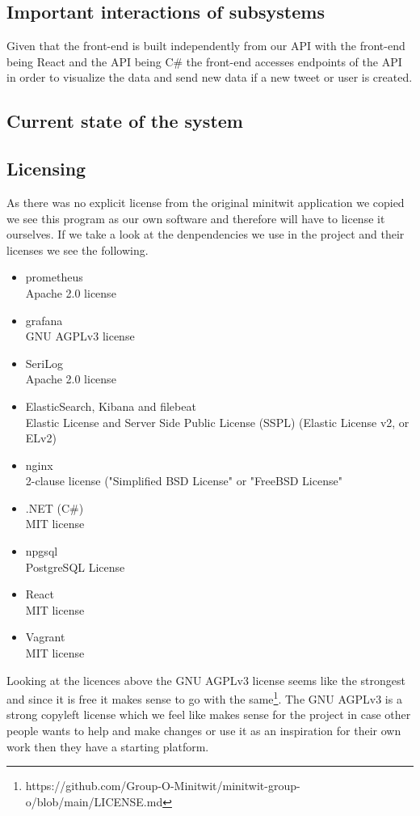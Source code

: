 \documentclass{article}
\begin{document}

\subsection{Important interactions of subsystems}
Given that the front-end is built independently from our API with the front-end being React and the API being C\# the front-end accesses endpoints of the API in order to visualize the data and send new data if a new tweet or  user is created. 
\subsection{Current state of the system}
\subsection{Licensing}
As there was no explicit license from the original minitwit application we copied we see this program as our own software and therefore will have to license it ourselves. If we take a look at the denpendencies we use in the project and their licenses we see the following.
\begin{itemize}
    \item prometheus\\
    Apache 2.0 license
    \item grafana\\
    GNU AGPLv3 license
    \item SeriLog\\
    Apache 2.0 license
    \item ElasticSearch, Kibana and filebeat\\
    Elastic License and Server Side Public License (SSPL) (Elastic License v2, or ELv2) 
    \item nginx\\
    2-clause license ("Simplified BSD License" or "FreeBSD License"
    \item .NET (C\#)\\
    MIT license
    \item npgsql\\
    PostgreSQL License
    \item React\\
    MIT license
    \item Vagrant\\ 
    MIT license
\end{itemize} 
Looking at the licences above the GNU AGPLv3 license seems like the strongest and since it is free it makes sense to go with the same\footnote{https://github.com/Group-O-Minitwit/minitwit-group-o/blob/main/LICENSE.md}. The GNU AGPLv3 is a strong copyleft license which we feel like makes sense for the project in case other people wants to help and make changes or use it as an inspiration for their own work then they have a starting platform.
\end{document}
